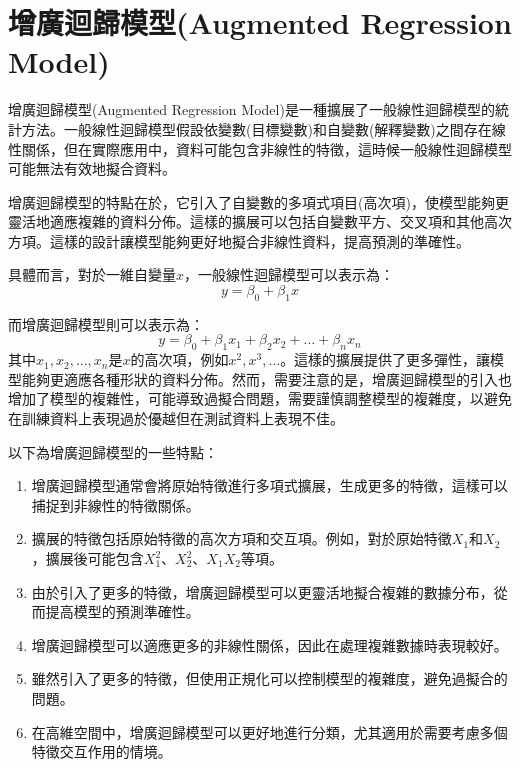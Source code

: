\section{增廣迴歸模型(Augmented Regression Model)}
增廣迴歸模型(Augmented Regression Model)是一種擴展了一般線性迴歸模型的統計方法。一般線性迴歸模型假設依變數(目標變數)和自變數(解釋變數)之間存在線性關係，但在實際應用中，資料可能包含非線性的特徵，這時候一般線性迴歸模型可能無法有效地擬合資料。

增廣迴歸模型的特點在於，它引入了自變數的多項式項目(高次項)，使模型能夠更靈活地適應複雜的資料分佈。這樣的擴展可以包括自變數平方、交叉項和其他高次方項。這樣的設計讓模型能夠更好地擬合非線性資料，提高預測的準確性。

具體而言，對於一維自變量$x$，一般線性迴歸模型可以表示為：$$y=\beta_0+\beta_1x$$

而增廣迴歸模型則可以表示為：$$y=\beta_0+\beta_1x_1+\beta_2x_2+\dots+\beta_nx_n$$
其中$x_1,x_2,\dots,x_n$是$x$的高次項，例如$x^2,x^3,\dots$。這樣的擴展提供了更多彈性，讓模型能夠更適應各種形狀的資料分佈。然而，需要注意的是，增廣迴歸模型的引入也增加了模型的複雜性，可能導致過擬合問題，需要謹慎調整模型的複雜度，以避免在訓練資料上表現過於優越但在測試資料上表現不佳。

以下為增廣迴歸模型的一些特點：
\begin{enumerate}
\item 增廣迴歸模型通常會將原始特徵進行多項式擴展，生成更多的特徵，這樣可以捕捉到非線性的特徵關係。
\item  擴展的特徵包括原始特徵的高次方項和交互項。例如，對於原始特徵$X_1$和$X_2$，擴展後可能包含$X_1^2$、$X_2^2$、$X_1X_2$等項。
\item 由於引入了更多的特徵，增廣迴歸模型可以更靈活地擬合複雜的數據分布，從而提高模型的預測準確性。
\item 增廣迴歸模型可以適應更多的非線性關係，因此在處理複雜數據時表現較好。
\item 雖然引入了更多的特徵，但使用正規化可以控制模型的複雜度，避免過擬合的問題。
\item 在高維空間中，增廣迴歸模型可以更好地進行分類，尤其適用於需要考慮多個特徵交互作用的情境。
\end{enumerate}
